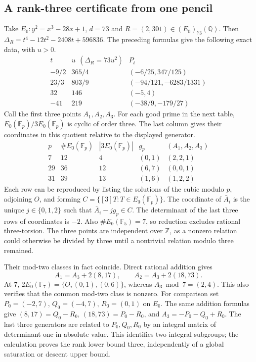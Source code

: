 \documentclass[11pt]{article}
\begin{document}
\subsection{A rank-three certificate from one pencil}
Take $E_0:y^2=x^3-28x+1$, $d=73$ and $R=(2,301)\in(E_0)_{73}(\mathbb Q)$.
Then $\Delta_R=t^4-12t^2-2408t+596836$. The preceding formulas
give the following exact data, with $u>0$.
\[
\begin{array}{r|r|c}
t&u\ \ (\Delta_R=73u^2)&P_t\\ \hline
-9/2 &365/4&(-6/25,347/125)\\
23/3 &803/9&(-94/121,-6283/1331)\\
32 &146&(-5,4)\\
-41 &219&(-38/9,-179/27)
\end{array}
\]
Call the first three points $A_1,A_2,A_3$. For each good prime in the
next table, $E_0(\mathbb F_p)/3E_0(\mathbb F_p)$ is cyclic of order
three. The last column gives their coordinates in this quotient relative
to the displayed generator.
\[
\begin{array}{r|r|r|c|c}
p&\#E_0(\mathbb F_p)&|3E_0(\mathbb F_p)|&g_p&(A_1,A_2,A_3)\\ \hline
7 &12&4&(0,1)&(2,2,1)\\
29&36&12&(6,7)&(0,0,1)\\
31&39&13&(1,6)&(1,2,2)
\end{array}
\]
Each row can be reproduced by listing the solutions of the cubic modulo
$p$, adjoining $O$, and forming $C=\{[3]T:T\in E_0(\mathbb F_p)\}$.
The coordinate of $\bar A_i$ is the unique $j\in\{0,1,2\}$ such that
$\bar A_i-jg_p\in C$. The determinant of the last three rows of
coordinates is $-2$. Also $\#E_0(\mathbb F_5)=7$, so reduction excludes
rational three-torsion. The three points are independent over $\mathbb Z$,
as a nonzero relation could otherwise be divided by three until a
nontrivial relation modulo three remained.

Their mod-two classes in fact coincide. Direct rational addition gives
\[
 A_1=A_3+2(8,17),\qquad A_2=A_3+2(18,73).
\]
At $7$, $2E_0(\mathbb F_7)=\{O,(0,1),(0,6)\}$, whereas
$A_3\bmod7=(2,4)$. This also verifies that the common mod-two class
is nonzero. For comparison set $P_0=(-2,7)$, $Q_0=(-4,7)$,
$R_0=(0,1)$ on $E_0$. The same addition formulas give
$(8,17)=Q_0-R_0$, $(18,73)=P_0-R_0$, and $A_3=-P_0-Q_0+R_0$.
The last three generators are related to $P_0,Q_0,R_0$ by an
integral matrix of determinant one in absolute value. This identifies
two integral subgroups; the calculation proves the rank lower bound
three, independently of a global saturation or descent upper bound.
\end{document}
